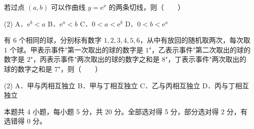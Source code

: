 \begin{question}
若过点 $(a,b)$ 可以作曲线 $y=\mathrm e^{x}$ 的两条切线，则\mbox{（　　）}

\begin{gkopts}(2)
\task A．$\mathrm e^{b}<a$
\task B．$\mathrm e^{a}<b$
\task C．$0<a<\mathrm e^{b}$
\task D．$0<b<\mathrm e^{a}$
\end{gkopts}

\end{question}
\begin{question}
有 $6$ 个相同的球，分别标有数字 $1,2,3,4,5,6$，从中有放回的随机取两次，每次取 $1$ 个球。甲表示事件"第一次取出的球的数字是 $1$"，乙表示事件"第二次取出的球的数字是 $2$"，丙表示事件"两次取出的球的数字之和是 $8$"，丁表示事件"两次取出的球的数字之和是 $7$"，则\mbox{（　　）}

\begin{gkopts}(2)
\task A．甲与丙相互独立
\task B．甲与丁相互独立
\task C．乙与丙相互独立
\task D．丙与丁相互独立
\end{gkopts}

\par\medskip

\end{question}

\begin{gktip}
本题共 4 小题，每小题 5 分，共 20 分。全部选对得 5 分，部分选对得 2 分，有选错得 0 分。
\end{gktip}

